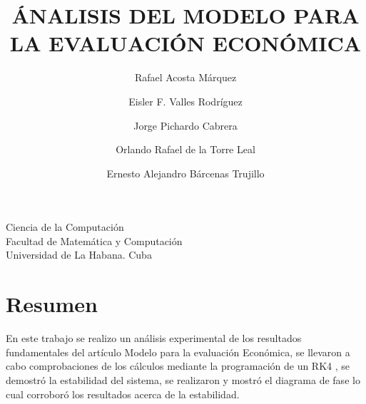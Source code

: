 \documentclass{wscpaperproc}
\theoremstyle{wsc}
\begin{document}
%
%

\title{\'ANALISIS DEL MODELO PARA LA EVALUACI\'ON ECON\'OMICA}
Ciencia de la Computaci\'on\\
	Facultad de Matem\'atica y Computaci\'on\\
	Universidad de La Habana. Cuba\\
\author{Rafael Acosta M\'arquez\\[12pt]
	
\and
Eisler F. Valles Rodr\'iguez\\[12pt]
\and
Jorge Pichardo Cabrera\\[12pt]
\and
Orlando Rafael de la Torre Leal\\[12pt]
\and
Ernesto Alejandro B\'arcenas Trujillo\\[12pt]

}


\maketitle
\newpage

\section*{Resumen}
En este trabajo se realizo un an\'alisis experimental de los resultados fundamentales
del art\'iculo Modelo para la evaluaci\'on Econ\'omica, se llevaron a cabo comprobaciones 
de los c\'alculos mediante la programaci\'on de un RK4 , se demostr\'o la estabilidad del sistema, se realizaron y mostr\'o el diagrama de fase lo cual corrobor\'o los resultados acerca de la estabilidad.\\
\end{document}
